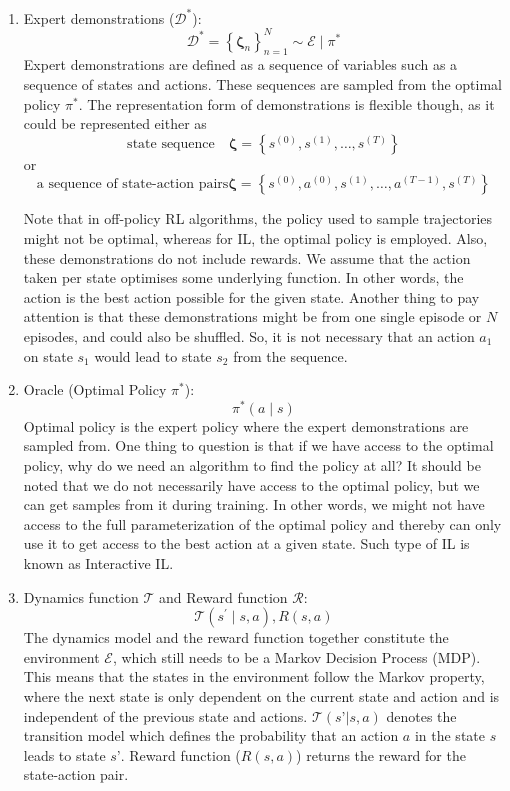 \documentclass[11pt]{article}
\begin{document}
\begin{enumerate}
    \item Expert demonstrations ($\mathcal{D}^{*}$): 
    $$
\mathcal{D}^{*}=\left\{\boldsymbol{\zeta}_{n}\right\}_{n=1}^{N} \sim \mathcal{E} \mid \pi^{*}
$$
    Expert demonstrations are defined as a sequence of variables such as a sequence of states and actions. These sequences are sampled from the optimal policy $\pi^{*}$. The representation form of demonstrations is flexible though, as it could be represented either as 
    $$\text{state sequence}\quad \boldsymbol{\zeta}=\left\{s^{(0)}, s^{(1)}, \ldots, s^{(T)}\right\}$$  
    or 
    $$\text{a sequence of state-action pairs}\boldsymbol{\zeta}=\left\{s^{(0)}, a^{(0)}, s^{(1)}, \ldots, a^{(T-1)}, s^{(T)}\right\}$$
    
    Note that in off-policy RL algorithms, the policy used to sample trajectories might not be optimal, whereas for IL, the optimal policy is employed. Also, these demonstrations do not include rewards. We assume that the action taken per state optimises some underlying function. In other words, the action is the best action possible for the given state. Another thing to pay attention is that these demonstrations might be from one single episode or $N$ episodes, and could also be shuffled. So, it is not necessary that an action $a_1$ on state $s_1$ would lead to state $s_2$ from the sequence.
     
    \item Oracle (Optimal Policy $ \pi^{*}$): 
    $$
    \pi^{*}(a \mid s)
    $$
    Optimal policy is the expert policy where the expert demonstrations are sampled from. One thing to question is that if we have access to the optimal policy, why do we need an algorithm to find the  policy at all? It should be noted that we do not necessarily have access to the optimal policy, but we can get samples from it during training. In other words, we might not have access to the full parameterization of the optimal policy and thereby can only use it to get access to the best action at a given state. Such type of IL is known as Interactive IL. 
  
    
    \item Dynamics function $\mathcal{T}$ and Reward function $\mathcal{R}$: 
    $$
    \mathcal{T}\left(s^{\prime} \mid s, a\right), R\left(s, a\right)
    $$
    The dynamics model and the reward function together constitute the environment $\mathcal{E}$, which still needs to be a Markov Decision Process (MDP). This means that the states in the environment follow the Markov property, where the next state is only dependent on the current state and action and is independent of the previous state and actions. 
     $\mathcal{T}(s’|s,a)$ denotes the transition model which defines the probability that an action $a$ in the state $s$ leads to state $s’$.  Reward function ($R(s,a)$) returns the reward for the state-action pair.
\end{enumerate}
\end{document}
